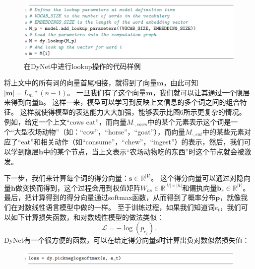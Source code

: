 \documentclass[10pt,a4paper]{ctexart}
\begin{document}
\begin{figure}[H]
\centering
\includegraphics[width=1\textwidth]{fig13.png}
\caption{在DyNet中进行lookup操作的代码样例}
\label{fig:13}
\end{figure}

将上文中的所有词的向量首尾相接，就得到了向量$\textbf{m}$，由此可知$|\textbf{m}|=L_m * (n-1)$。
一旦我们有了这个向量$\textbf{m}$，我们就可以让其通过一个隐层来得到向量$\textbf{h}$。
这样一来，模型可以学习到反映上文信息的多个词之间的组合特征。
这样就使得模型的表达能力大大加强，能够表示比图6所示更复杂的情况。
例如，给定一个上文“cows eat”，而向量$M_{\cdot,cows}$中的某个元素表示这个词是一个“大型农场动物”（如：“cow”，“horse”，“goat”），而向量$M_{\cdot,eat}$中的某些元素对应了“eat”和相关动作（如“consume”，“chew”，“ingest”）的表示，然后，我们可以学到隐层$\textbf{h}$中的某个节点，当上文表示“农场动物吃的东西”时这个节点就会被激发。

下一步，我们来计算每个词的得分向量：$\textbf{s} \in \mathbb{R}^{|V|}$。
这个得分向量可以通过对隐向量$\textbf{h}$做变换而得到，这个过程会用到权值矩阵$W_{hs} \in \mathbb{R}^{|V| \times |h|}$和偏执向量$\textbf{b}_s \in \mathbb{R}^{|V|}$。
最后，把计算得到的得分向量通过softmax函数，从而得到了概率分布$\textbf{p}$，就像我们在对数线性语言模型中做的一样。
至于训练过程，如果我们知道词$e_t$，我们可以如下计算损失函数，和对数线性模型的做法类似：
\[
 \mathcal{L} = - \log (p_{e_t}).
\]
DyNet有一个很方便的函数，可以在给定得分向量$\textbf{s}$时计算出负对数似然损失值：

\begin{figure}[H]
\centering
\includegraphics[width=1\textwidth]{fig131.png}
\end{figure}
\end{document}
